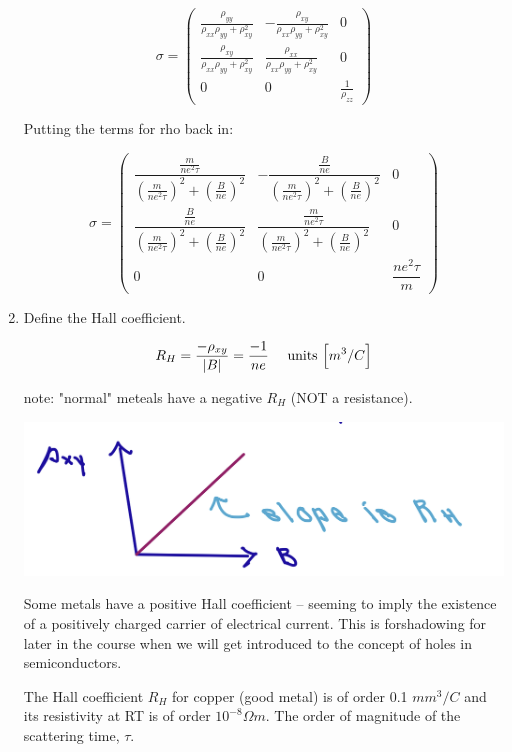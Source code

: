 \begin{enumerate}[label=(\alph*)]
\[ \sigma = \begin{pmatrix}
    \frac{\rho_{yy}}{\rho_{xx} \rho_{yy} + \rho_{xy}^2} & -\frac{\rho_{xy}}{\rho_{xx} \rho_{yy} + \rho_{xy}^2} & 0 \\ \frac{\rho_{xy}}{\rho_{xx} \rho_{yy} + \rho_{xy}^2} & \frac{\rho_{xx}}{\rho_{xx}\rho_{yy}+\rho_{xy}^2} & 0 \\ 0 & 0 & \frac{1}{\rho_{zz}}
\end{pmatrix} \]

Putting the terms for rho back in:

\[
\sigma = \begin{pmatrix}
    \dfrac{\frac{m}{ne^2\tau}}{\left(\frac{m}{ne^2\tau}\right)^2 + \left(\frac{B}{ne}\right)^2} & -\dfrac{\frac{B}{ne}}{\left(\frac{m}{ne^2\tau}\right)^2 + \left(\frac{B}{ne}\right)^2} & 0 \\
    \dfrac{\frac{B}{ne}}{\left(\frac{m}{ne^2\tau}\right)^2 + \left(\frac{B}{ne}\right)^2} & \dfrac{\frac{m}{ne^2\tau}}{\left(\frac{m}{ne^2\tau}\right)^2 + \left(\frac{B}{ne}\right)^2} & 0 \\
    0 & 0 & \dfrac{ne^2\tau}{m}
\end{pmatrix}
\]



\item Define the Hall coefficient.

    
\[ R_H = \frac{-\rho_{xy}}{|B|} = \frac{-1}{ne} \quad \text{ units } \brackets*{m^3/C}\]

    note: "normal" meteals have a negative $R_H$ (NOT a resistance).

    \begin{center}
        \includegraphics[width = 0.4 \linewidth]{Images/hall-effect-slope.png}
    \end{center}

Some metals have a positive Hall coefficient -- seeming to imply the existence of a positively charged carrier of electrical current. This is forshadowing for later in the course when we will get introduced to the concept of holes in semiconductors.

The Hall coefficient $R_H$ for copper (good metal) is of order 0.1 $mm^3/C$ and its resistivity at RT is of order $10^{-8} \Omega m$. The order of magnitude of the scattering time, $\tau$.
    

\end{enumerate}
